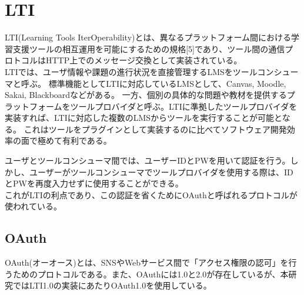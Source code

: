 \section{LTI}\label{tag:LTI}
LTI(Learning Tools IterOperability)とは、異なるプラットフォーム間における学習支援ツールの相互運用を可能にするための規格[5]であり、ツール間の通信プロトコルはHTTP上でのメッセージ交換として実装されている。\\

LTIでは、ユーザ情報や課題の進行状況を直接管理するLMSをツールコンシューマと呼ぶ。
標準機能としてLTIに対応しているLMSとして、Canvas, Moodle, Sakai, Blackboardなどがある。
一方、個別の具体的な問題や教材を提供するプラットフォームをツールプロバイダと呼ぶ。LTIに準拠したツールプロバイダを実装すれば、LTIに対応した複数のLMSからツールを実行することが可能となる。
これはツールをプラグインとして実装するのに比べてソフトウェア開発効率の面で極めて有利である。

ユーザとツールコンシューマ間では、ユーザーIDとPWを用いて認証を行う。しかし、ユーザーがツールコンシューマでツールプロバイダを使用する際は、IDとPWを再度入力せずに使用することができる。\\
これがLTIの利点であり、この認証を省くためにOAuthと呼ばれるプロトコルが使われている。
\subsection{OAuth}
OAuth(オーオース)とは、SNSやWebサービス間で「アクセス権限の認可」を行うためのプロトコルである。また、OAuthには1.0と2.0が存在しているが、本研究ではLTI1.0の実装にあたりOAuth1.0を使用している。

